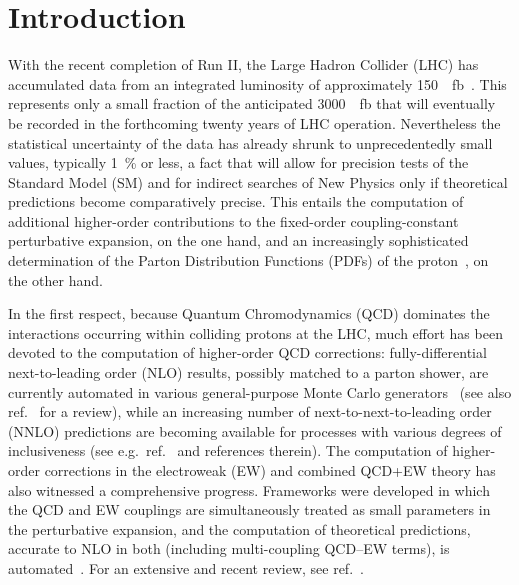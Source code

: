 \section{Introduction}
\label{sec:introduction}

With the recent completion of Run II, the Large Hadron Collider (LHC) has 
accumulated data from an integrated luminosity of approximately 
\SI{150}{\per\femto\barn}~\cite{Mangano:2020icy}. This represents only a small fraction of
the anticipated \SI{3000}{\per\femto\barn} that will eventually be recorded in the
forthcoming twenty years of LHC operation. Nevertheless the statistical 
uncertainty of the data has already shrunk to unprecedentedly small values,
typically \SI{1}{\percent} or less, a fact that will allow for precision tests of the
Standard Model (SM) and for indirect searches of New Physics only if 
theoretical predictions become comparatively precise. This entails the 
computation of additional higher-order contributions to the fixed-order 
coupling-constant perturbative expansion, on the one hand, and an increasingly 
sophisticated determination of the Parton Distribution Functions (PDFs) of the 
proton~\cite{Gao:2017yyd,Ethier:2020way}, on the other hand. 

In the first respect, because Quantum Chromodynamics (QCD) dominates the 
interactions occurring within colliding protons at the LHC, much effort 
has been devoted to the computation of higher-order QCD corrections: 
fully-differential next-to-leading order (NLO) results, possibly matched to a
parton shower, are currently automated in various general-purpose
Monte Carlo generators~\cite{Gleisberg:2008ta,Alwall:2014hca,Bellm:2015jjp}
(see also ref.~\cite{Buckley:2011ms} for a review),
while an increasing number of next-to-next-to-leading order (NNLO) predictions 
are becoming available for processes with various degrees of inclusiveness
(see e.g.\ ref.~\cite{Amoroso:2020lgh} and references therein). The computation
of higher-order corrections in the electroweak (EW) and combined QCD+EW theory has
also witnessed a comprehensive progress. Frameworks 
were developed in which the QCD and EW couplings are simultaneously treated as 
small parameters in the perturbative expansion, and the computation of 
theoretical predictions, accurate to NLO in both (including multi-coupling
QCD--EW terms), is automated~\cite{Kallweit:2014xda,Biedermann:2017yoi,Frederix:2018nkq}. For an extensive and recent review, see ref.~\cite{Denner:2019vbn}.

